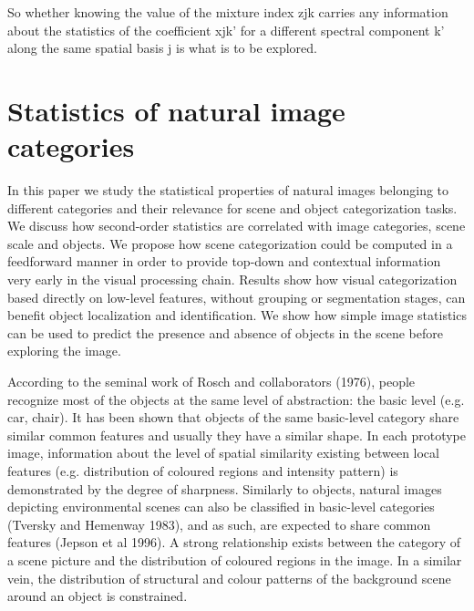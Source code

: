 \documentclass{article}
\begin{document}
So whether knowing the value of the mixture index zjk carries any information about the statistics of the coefficient xjk’ for a different spectral component k’ along the same spatial basis j is what is to be explored.






















\section{Statistics of natural image categories}

In this paper we study the statistical properties of natural images belonging to different categories and their relevance for scene and object categorization tasks. We discuss how second-order statistics are correlated with image categories, scene scale and objects. We propose how scene categorization could be computed in a feedforward manner in order to provide top-down and contextual information very early in the visual processing chain. Results show how visual categorization based directly on low-level features, without grouping or segmentation stages, can benefit object localization and identification. We show how simple image statistics can be used to predict the presence and absence of objects in the scene before exploring the image.

According to the seminal work of Rosch and collaborators (1976), people recognize most of the objects at the same level of abstraction: the basic level (e.g. car, chair). It has been shown that objects of the same basic-level category share similar common features and usually they have a similar shape.  In each prototype image, information about the level of spatial similarity existing between local features (e.g. distribution of coloured regions and intensity pattern) is demonstrated by the degree of sharpness. Similarly to objects, natural images depicting environmental scenes can also be classified
in basic-level categories (Tversky and Hemenway 1983), and as such, are expected to share common features (Jepson et al 1996).  A strong relationship exists between the category of a scene picture and the distribution of coloured regions in the image. In a similar vein, the distribution of structural and colour patterns of the background scene around an object is constrained.  
\end{document}

